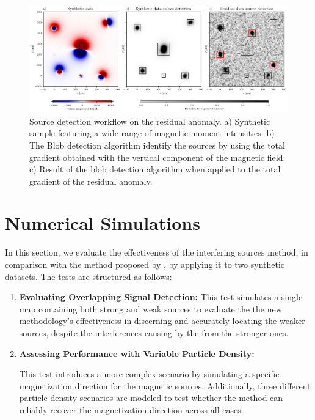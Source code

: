     \begin{figure}[tb!]
      \centering
      \includegraphics[width=1\linewidth]{paper/figures/re-detection-methodology.png}
      \caption{Source detection workflow on the residual anomaly. a) Synthetic sample featuring a wide range of magnetic moment intensities. b) The Blob detection algorithm identify the sources by using the total gradient obtained with the vertical component of the magnetic field. c) Result of the blob detection algorithm when applied to the total gradient of the residual anomaly.}
      \label{method-redetection}
    \end{figure}



\section{Numerical Simulations}

In this section, we evaluate the effectiveness of the interfering sources method, in comparison with the method proposed by \citet{Souza-Junior2024}, by applying it to two synthetic datasets. The tests are structured as follows:  

\begin{enumerate}
    \item \textbf{Evaluating Overlapping Signal Detection:}
        This test simulates a single map containing both strong and weak sources to evaluate the the new methodology's effectiveness in discerning and accurately locating the weaker sources, despite the interferences causing by the from the stronger ones.
        
    \item \textbf{Assessing Performance with Variable Particle Density:}
    
        This test introduces a more complex scenario by simulating a specific magnetization direction for the magnetic sources. Additionally, three different particle density scenarios are modeled to test whether the method can reliably recover the magnetization direction across all cases.
        
\end{enumerate}

